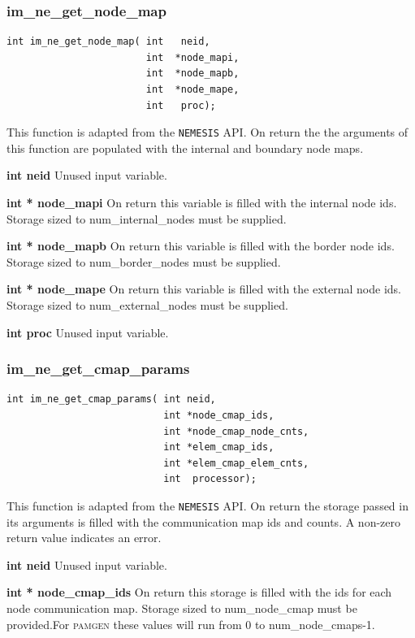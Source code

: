 \subsubsection{im\_ne\_get\_node\_map}
{\ttfamily  \begin{verbatim}
int im_ne_get_node_map( int   neid,
                        int  *node_mapi,
                        int  *node_mapb,
                        int  *node_mape,
                        int   proc);
\end{verbatim}}

This function is adapted from the \texttt{NEMESIS} API. On return the the arguments of this function are populated with the internal and boundary node maps.

{\setlength{\parindent}{0pt}
 \textbf{int neid} Unused input variable.}

{\setlength{\parindent}{0pt}
 \textbf{int * node\_mapi} On return this variable is filled with the internal node ids. Storage sized to num\_internal\_nodes must be supplied.}

{\setlength{\parindent}{0pt}
 \textbf{int * node\_mapb} On return this variable is filled with the border node ids. Storage sized to num\_border\_nodes must be supplied. }

{\setlength{\parindent}{0pt}
 \textbf{int * node\_mape} On return this variable is filled with the external node ids. Storage sized to num\_external\_nodes must be supplied. }


{\setlength{\parindent}{0pt}
 \textbf{int proc} Unused input variable.}


\subsubsection{im\_ne\_get\_cmap\_params}
{\ttfamily  \begin{verbatim}
int im_ne_get_cmap_params( int neid,
                           int *node_cmap_ids,
                           int *node_cmap_node_cnts,
                           int *elem_cmap_ids,
                           int *elem_cmap_elem_cnts,
                           int  processor);
\end{verbatim}}
This function is adapted from the \texttt{NEMESIS} API. On return the storage passed in its arguments is filled with the communication map ids and counts.  A non-zero return value indicates an error.

{\setlength{\parindent}{0pt}
 \textbf{int neid} Unused input variable.}

{\setlength{\parindent}{0pt}
 \textbf{int * node\_cmap\_ids} On return this storage is filled with the ids for each node communication map. Storage sized to num\_node\_cmap must be provided.For \textsc{pamgen} these values will run from 0 to num\_node\_cmaps-1.}

